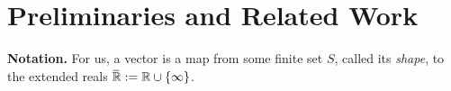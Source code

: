 \documentclass[twoside]{article}
\begin{document}
\section{Preliminaries and Related Work}

\textbf{Notation.}
%
%
For us, a vector is a map from some finite set $S$, called its 
\emph{shape},
to the extended reals $\mskip1mu\overline{\mskip-1mu\mathbb R\!}\, := \mathbb R \cup \{\infty\}$.
\end{document}
